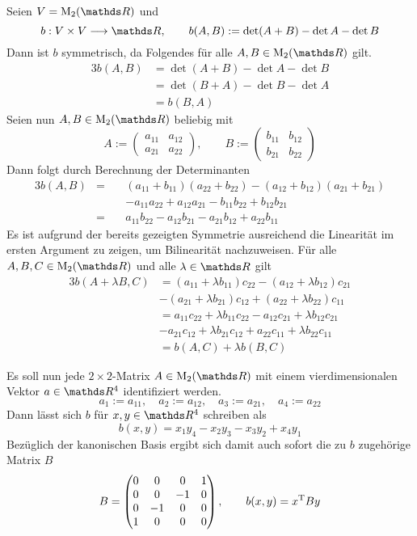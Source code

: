 			Seien $V=\m{M}_2(\SR)$ und
			\[ b:V\times V\longrightarrow \SR,\qquad b(A,B) := \det(A+B)-\det A - \det B \]
			Dann ist $b$ symmetrisch, da Folgendes für alle $A,B\in\m{M}_2(\SR)$ gilt.
			\begin{alignat*}{3}
				b(A,B) &= \det(A+B)-\det A - \det B \\
					&= \det(B+A) - \det B - \det A \\
					&= b(B,A)
			\end{alignat*}
			Seien nun $A,B\in\m{M}_2(\SR)$ beliebig mit
			\[
				A:=
				\begin{pmatrix}
					a_{11} & a_{12} \\ a_{21} & a_{22}
				\end{pmatrix} ,\qquad
				B:=
				\begin{pmatrix}
					b_{11} & b_{12} \\ b_{21} & b_{22}					
				\end{pmatrix}
			\]
			Dann folgt durch Berechnung der Determinanten
			\begin{alignat*}{3}
				b(A,B) &=\ && (a_{11} + b_{11})(a_{22}+b_{22}) - (a_{12}+b_{12})(a_{21}+b_{21}) \\
					& &&- a_{11}a_{22} + a_{12}a_{21} - b_{11}b_{22} + b_{12}b_{21} \\
					&=\ && a_{11}b_{22} - a_{12}b_{21} - a_{21}b_{12} + a_{22}b_{11}
			\end{alignat*}
			Es ist aufgrund der bereits gezeigten Symmetrie ausreichend die Linearität im ersten Argument zu zeigen, um Bilinearität nachzuweisen.
			Für alle $A,B,C\in\m{M}_2(\SR)$ und alle $\lambda\in\SR$ gilt
			\begin{alignat*}{3}
				b(A+\lambda B,C) &= (a_{11} + \lambda b_{11})c_{22} - (a_{12} + \lambda b_{12})c_{21} \\
					&- (a_{21} + \lambda b_{21})c_{12} + (a_{22} + \lambda b_{22})c_{11} \\
					&= a_{11}c_{22} + \lambda b_{11}c_{22} - a_{12}c_{21} + \lambda b_{12}c_{21} \\
					&- a_{21}c_{12} + \lambda b_{21}c_{12} + a_{22}c_{11} + \lambda b_{22}c_{11} \\
					&= b(A,C) + \lambda b(B,C)
			\end{alignat*}
			
			Es soll nun jede $2\times 2$-Matrix $A\in\m{M}_2(\SR)$ mit einem vierdimensionalen Vektor $a\in\SR^4$ identifiziert werden.
			\[ a_1 := a_{11},\quad a_2 := a_{12},\quad a_3 := a_{21},\quad a_4:=a_{22} \]
			Dann lässt sich $b$ für $x,y\in\SR^4$ schreiben als
			\[ b(x,y) = x_1y_4 - x_2y_3 - x_3y_2 + x_4y_1 \]
			Bezüglich der kanonischen Basis ergibt sich damit auch sofort die zu $b$ zugehörige Matrix $B$
			\[
				B = 
				\begin{pmatrix}
					0 & 0 & 0 & 1 \\
					0 & 0 & -1 & 0 \\
					0 & -1 & 0 & 0 \\
					1 & 0 & 0 & 0
				\end{pmatrix}
				,\qquad b(x,y) = x^{\mathrm{T}}By
			\]

